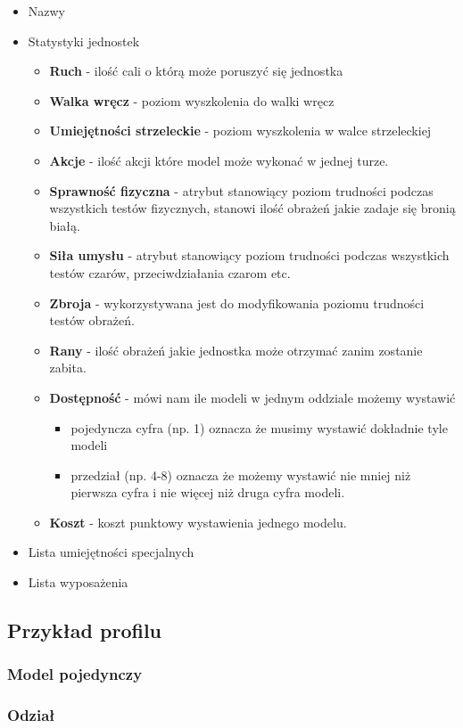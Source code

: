 \begin{itemize}
    \item Nazwy
    \item Statystyki jednostek
    \begin{itemize}
    	\item \textbf{Ruch} - ilość cali o którą może poruszyć się jednostka 
    	\item \textbf{Walka wręcz} - poziom wyszkolenia do walki wręcz
    	\item \textbf{Umiejętności strzeleckie} - poziom wyszkolenia w walce strzeleckiej
    	\item \textbf{Akcje} - ilość akcji które model może wykonać w jednej turze.
    	\item \textbf{Sprawność fizyczna} - atrybut stanowiący poziom trudności podczas wszystkich testów fizycznych, stanowi ilość obrażeń jakie zadaje się bronią białą. 
    	\item \textbf{Siła umysłu} - atrybut  stanowiący poziom trudności podczas wszystkich testów czarów, przeciwdziałania czarom etc.
    	\item \textbf{Zbroja} - wykorzystywana jest do modyfikowania poziomu trudności testów obrażeń. 
    	\item \textbf{Rany} - ilość obrażeń jakie jednostka może otrzymać zanim zostanie zabita. 
    	\item \textbf{Dostępność} - mówi nam ile modeli w jednym oddziale możemy wystawić
    	    \begin{itemize}
    	        \item pojedyncza cyfra (np. 1) oznacza że musimy wystawić dokładnie tyle modeli
    	        \item przedział (np. 4-8) oznacza że możemy wystawić nie mniej niż pierwsza cyfra i nie więcej niż druga cyfra modeli. 
    	    \end{itemize}
    	\item \textbf{Koszt} - koszt punktowy wystawienia jednego modelu. 
    \end{itemize} 
    \item Lista umiejętności specjalnych
    \item Lista wyposażenia 
\end{itemize}

\subsection{Przykład profilu}
\subsubsection{Model pojedynczy}

\subsubsection{Odział}



